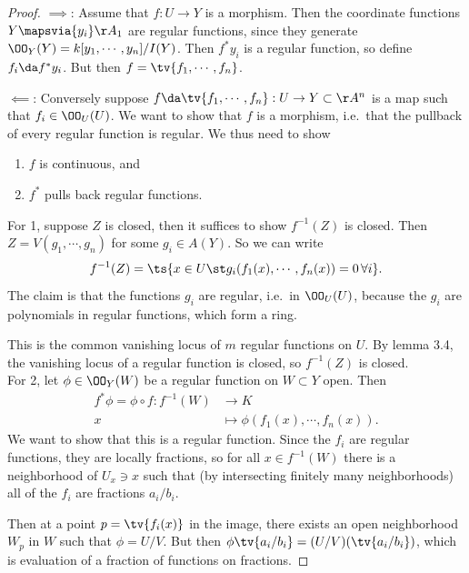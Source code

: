 \begin{proof}

\(\implies\): Assume that \(f: U\to Y\) is a morphism. Then the
coordinate functions \(Y\mapsvia{y_i} \AA_1\) are regular functions,
since they generate \(\OO_Y(Y) = k[y_1, \cdots, y_n]/I(Y)\). Then
\(f^* y_i\) is a regular function, so define \(f_i \da f^* y_i\). But
then \(f = \tv{f_1, \cdots, f_n}\).

\(\impliedby\): Conversely suppose
\(f \da \tv{f_1, \cdots, f_n}: U\to Y \subset \AA^n\) is a map such that
\(f_i \in \OO_U(U)\). We want to show that \(f\) is a morphism,
i.e.~that the pullback of every regular function is regular. We thus
need to show

\begin{enumerate}
\def\labelenumi{\arabic{enumi}.}
\tightlist
\item
  \(f\) is continuous, and
\item
  \(f^*\) pulls back regular functions.
\end{enumerate}

For 1, suppose \(Z\) is closed, then it suffices to show \(f^{-1} (Z)\)
is closed. Then \(Z = V(g_1, \cdots, g_n)\) for some \(g_i \in A(Y)\).
So we can write
\begin{align*}  
f^{-1} (Z) = \ts{
x\in U \st g_i(f_1(x), \cdots, f_n(x)  ) = 0\, \forall i
}
.\end{align*} The claim is that the functions \(g_i\) are regular,
i.e.~in \(\OO_U(U)\), because the \(g_i\) are polynomials in regular
functions, which form a ring.

This is the common vanishing locus of \(m\) regular functions on \(U\).
By lemma 3.4, the vanishing locus of a regular function is closed, so
\(f^{-1} (Z)\) is closed.\\

For 2, let \(\phi \in \OO_Y(W)\) be a regular function on \(W\subset Y\)
open. Then
\begin{align*}  
f^* \phi  = \phi \circ f: f^{-1} (W) &\to K \\
x &\mapsto \phi(f_1(x), \cdots, f_n(x))
.\end{align*} We want to show that this is a regular function. Since the
\(f_i\) are regular functions, they are locally fractions, so for all
\(x\in f^{-1} (W)\) there is a neighborhood of \(U_x\ni x\) such that
(by intersecting finitely many neighborhoods) all of the \(f_i\) are
fractions \(a_i/b_i\).

Then at a point \(p = \tv{f_i(x)}\) in the image, there exists an open
neighborhood \(W_p\) in \(W\) such that \(\phi = U/V\). But then
\(\phi{\tv{a_i /b_i}} = (U/V)(\tv{a_i/b_i})\), which is evaluation of a
fraction of functions on fractions.

\end{proof}

